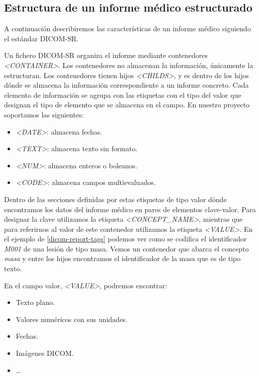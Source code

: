 \subsection{Estructura de un informe médico estructurado} \label{dicomsr:ficheros}
A continuación describiremos las características de un informe médico siguiendo el estándar DICOM-SR.\par
Un fichero DICOM-SR organiza el informe mediante contenedores \textit{<CONTAINER>}. Los contenedores no almacenan la información, únicamente la estructuran. Los contenedores tienen hijos \textit{<CHILDS>}, y es dentro de los hijos dónde se almacena la información correspondiente a un informe concreto. Cada elemento de información se agrupa con las etiquetas con el tipo del valor que designan el tipo de elemento que se almacena en el campo. En nuestro proyecto soportamos las siguientes:
\begin{itemize} 
 	\item \textit{<DATE>}: almacena fechas.
 	\item \textit{<TEXT>}: almacena texto sin formato.
 	\item \textit{<NUM>}: almacena enteros o boleanos.
 	\item \textit{<CODE>}: almacena campos multievaluados.
 \end{itemize}
Dentro de las secciones definidas por estas etiquetas de tipo valor dónde encontramos los datos del informe médico en pares de elementos clave-valor. Para designar la clave utilizamos la etiqueta \textit{<CONCEPT\_NAME>}, mientras que para referirnos al valor de este contenedor utilizamos la etiqueta \textit{<VALUE>}.
En el ejemplo de \ref{dicom-report-tags} podemos ver como se codifica el identificador \textit{M001} de una lesión de tipo masa. Vemos un contenedor que abarca el concepto \textit{masa} y entre los hijos encontramos el identificador de la masa que es de tipo texto.\par
En el campo valor, \textit{<VALUE>}, podremos encontrar:
\begin{itemize}
	\item Texto plano.
	\item Valores numéricos con sus unidades.
	\item Fechas.
	\item Imágenes DICOM.
	\item \ldots
\end{itemize}\par

